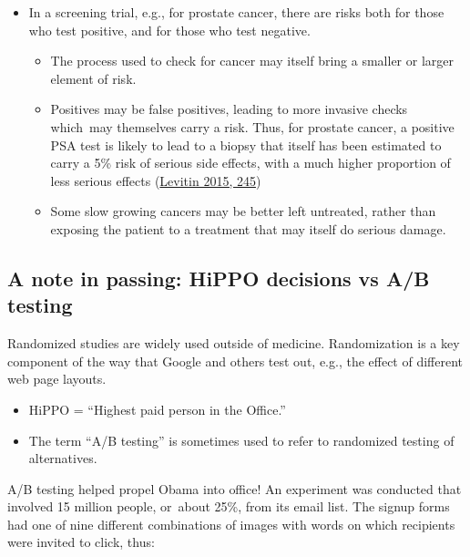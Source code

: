 \documentclass[
  10pt,
  b5paper]{book}
\providecommand{\tightlist}{%
  \setlength{\itemsep}{0pt}\setlength{\parskip}{0pt}}
\begin{document}
\begin{itemize}
\tightlist
\item
  In a screening trial, e.g., for prostate cancer, there are
  risks both for those who test positive, and for
  those who test negative.

  \begin{itemize}
  \tightlist
  \item
    The process used to check for cancer may itself bring
    a smaller or larger element of risk.
  \item
    Positives may be false positives, leading to more invasive
    checks which~may themselves carry a risk. Thus, for prostate
    cancer, a positive PSA test is likely to lead to a biopsy that
    itself has been estimated to carry a 5\% risk of serious side
    effects, with a much higher proportion of less serious effects
    (\protect\hyperlink{ref-levitin_2015}{Levitin 2015, 245})
  \item
    Some slow growing cancers may be better left untreated,
    rather than exposing the patient to a treatment that may itself
    do serious damage.
  \end{itemize}
\end{itemize}

\hypertarget{a-note-in-passing-hippo-decisions-vs-ab-testing}{%
\subsection*{A note in passing: HiPPO decisions vs A/B testing}\label{a-note-in-passing-hippo-decisions-vs-ab-testing}}

Randomized studies are widely used outside of medicine.
Randomization is a key component of the way that Google and
others test out, e.g., the effect of different web page layouts.

\begin{itemize}
\tightlist
\item
  HiPPO = ``Highest paid person in the Office.''
\item
  The term ``A/B testing'' is sometimes used to refer to randomized
  testing of alternatives.
\end{itemize}

A/B testing helped propel Obama into office! An experiment was
conducted that involved 15 million people, or~about 25\%, from
its email list. The signup forms had one of nine different
combinations of images with words on which recipients were
invited to click, thus:
\end{document}
